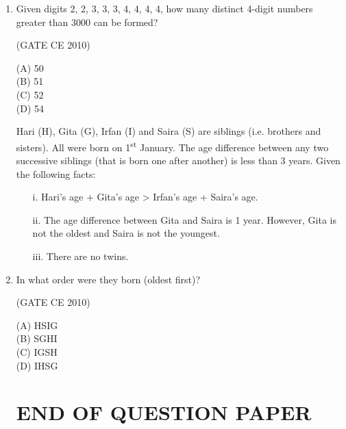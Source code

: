 \documentclass[journal,12pt,onecolumn]{exam}
\theoremstyle{remark}
\begin{document}
\begin{enumerate}
\begin{multicols}{4}
\noindent(A) 20 days\\
(B) 18 days\\
(C) 16 days\\
(D) 15 days
\end{multicols}

\setlength{\parskip}{0.5cm}

\noindent\item Given digits 2, 2, 3, 3, 3, 4, 4, 4, 4, how many distinct 4-digit numbers greater than 3000 can be formed?

\hfill{(GATE CE 2010)}

\begin{multicols}{4}
\noindent(A) 50\\
(B) 51\\
(C) 52\\
(D) 54
\end{multicols}


\noindent Hari (H), Gita (G), Irfan (I) and Saira (S) are siblings (i.e. brothers and sisters). All were born on 1\textsuperscript{st} January. The age difference between any two successive siblings (that is born one after another) is less than 3 years. Given the following facts:

\begin{itemize}
  \item[i.] Hari’s age + Gita’s age > Irfan’s age + Saira’s age.
  \item[ii.] The age difference between Gita and Saira is 1 year. However, Gita is not the oldest and Saira is not the youngest.
  \item[iii.] There are no twins.
\end{itemize}

\noindent \item  In what order were they born (oldest first)?

\hfill{(GATE CE 2010)}

\begin{multicols}{2}
\noindent(A) HSIG\\
(B) SGHI\\
(C) IGSH\\
(D) IHSG
\end{multicols}

\begin{center}
\section*{END OF QUESTION PAPER}
\end{center}

\end{enumerate}
\end{document}
